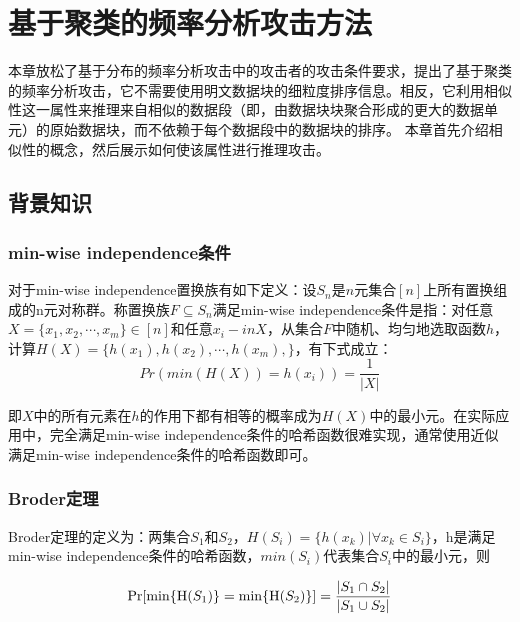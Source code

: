 \chapter{基于聚类的频率分析攻击方法}
\label{sec:ClusteringAttack}

本章放松了基于分布的频率分析攻击中的攻击者的攻击条件要求，提出了基于聚类的频率分析攻击，它不需要使用明文数据块的细粒度排序信息。相反，它利用相似性这一属性来推理来自相似的数据段（即，由数据块块聚合形成的更大的数据单元）的原始数据块，而不依赖于每个数据段中的数据块的排序。 本章首先介绍相似性的概念，然后展示如何使该属性进行推理攻击。

\section{背景知识}
\label{sec:similarity}

\subsection{min-wise independence条件}

对于min-wise independence置换族有如下定义：设$S_n$是$n$元集合$[n]$上所有置换组成的n元对称群。称置换族$F \subseteq S_n$满足min-wise independence条件是指：对任意$X=\{x_1,x_2,\cdots,x_m\}\in[n]$和任意$x_i-inX$，从集合$F$中随机、均匀地选取函数$h$，计算$H(X)=\{h(x_1),h(x_2),\cdots,h(x_m),\}$，有下式成立：
\begin{equation}
    \label{eq:min-wise independence}
    Pr(min(H(X)) = h(x_i) ) = \frac{1}{|X|}
\end{equation}

即$X$中的所有元素在$h$的作用下都有相等的概率成为$H(X)$中的最小元。在实际应用中，完全满足min-wise independence条件的哈希函数很难实现，通常使用近似满足min-wise independence条件的哈希函数即可。

\subsection{Broder定理}
Broder定理的定义为：两集合$S_1$和$S_2$，$H(S_i)=\{h(x_k)|\forall x_k \in S_i \}$，h是满足min-wise independence条件的哈希函数，$min(S_i)$代表集合$S_i$中的最小元，则

\begin{equation}
    \label{eq:broder}
    \Pr[\min\{{\rm H}(S_1)\} = \min\{{\rm H}(S_2)\} ] = \frac{|S_1 \cap S_2|}{|S_1 \cup S_2|}
\end{equation}

